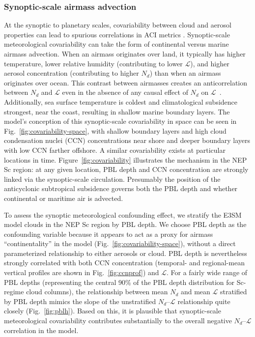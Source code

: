 \documentclass[acp, manuscript]{copernicus}\usepackage[]{graphicx}\usepackage[]{xcolor}
\newcommand\nd{\ensuremath{N_d}}
\newcommand\lwp{\ensuremath{\mathcal L}}
\begin{document}
\subsubsection{Synoptic-scale airmass advection}
\label{sec:synoptic}
At the synoptic to planetary scales, covariability between cloud and aerosol
properties can lead to spurious correlations in ACI metrics \citep{Grandey2010}.
Synoptic-scale meteorological covariability can take the form
of continental versus marine airmass advection.  When an airmass
originates over land, it typically has higher temperature, lower
relative humidity (contributing to lower \lwp),
and higher aerosol concentration (contributing to higher \nd) than
when an airmass originates over ocean.  
This contrast between
airmasses creates an anticorrelation between \nd{} and \lwp{} even in
the absence of any causal effect of \nd{} on \lwp\ \citep{Brenguier2003}.  Additionally, sea surface temperature
is coldest and climatological subsidence strongest, near the coast, resulting in shallow marine
boundary layers.  The model's conception of this synoptic-scale covariability in
space can be seen in
Fig.~\ref{fig:covariability-space}, with shallow boundary layers and high cloud
condensation nuclei (CCN)
concentrations near shore and deeper boundary layers with low CCN farther
offshore.  A similar covariability exists at particular locations in time.
Figure~\ref{fig:covariability} illustrates the mechanism in the NEP
Sc region: at any given location, PBL depth and CCN
concentration are strongly linked via the synoptic-scale circulation.
Presumably the position of the anticyclonic subtropical subsidence governs both
the PBL depth and whether continental or
maritime air is advected. 

To assess the synoptic meteorological confounding effect, we stratify the E3SM
model clouds in the NEP Sc region
by PBL depth.  We choose PBL depth as the confounding variable because it
appears to act as a proxy for airmass
``continentality'' in the model (Fig.~\ref{fig:covariability-space}), without
a direct parameterized relationship to either aerosols or cloud.  PBL depth is
nevertheless strongly correlated with both CCN concentration
(temporal- and regional-mean vertical profiles are shown in Fig.~\ref{fig:ccnprof}) and
\lwp{}.  For a fairly wide range of PBL
depths (representing the central 90\% of the PBL depth distribution
for Sc-regime cloud columns), the relationship between mean \nd{} and mean \lwp{} stratified by PBL
depth mimics the slope of the unstratified \nd--\lwp{} relationship quite closely
(Fig.~\ref{fig:pblh}).  Based on this, it is plausible  that
synoptic-scale meteorological covariability contributes substantially to the overall
negative \nd--\lwp{} correlation in the model.
\end{document}

